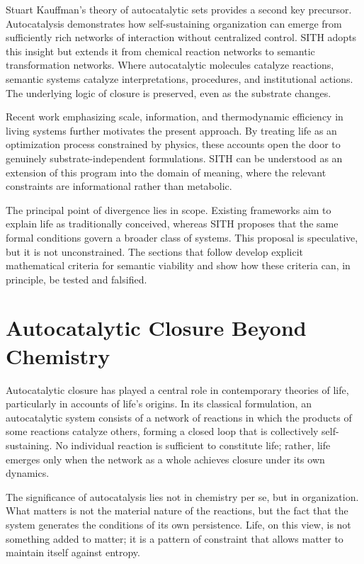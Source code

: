 \documentclass[11pt,oneside]{article}
\begin{document}
Stuart Kauffman’s theory of autocatalytic sets provides a second key precursor. Autocatalysis demonstrates how self-sustaining organization can emerge from sufficiently rich networks of interaction without centralized control. SITH adopts this insight but extends it from chemical reaction networks to semantic transformation networks. Where autocatalytic molecules catalyze reactions, semantic systems catalyze interpretations, procedures, and institutional actions. The underlying logic of closure is preserved, even as the substrate changes.

Recent work emphasizing scale, information, and thermodynamic efficiency in living systems further motivates the present approach. By treating life as an optimization process constrained by physics, these accounts open the door to genuinely substrate-independent formulations. SITH can be understood as an extension of this program into the domain of meaning, where the relevant constraints are informational rather than metabolic.

The principal point of divergence lies in scope. Existing frameworks aim to explain life as traditionally conceived, whereas SITH proposes that the same formal conditions govern a broader class of systems. This proposal is speculative, but it is not unconstrained. The sections that follow develop explicit mathematical criteria for semantic viability and show how these criteria can, in principle, be tested and falsified.


\section{Autocatalytic Closure Beyond Chemistry}

Autocatalytic closure has played a central role in contemporary theories of life, particularly in accounts of life’s origins. In its classical formulation, an autocatalytic system consists of a network of reactions in which the products of some reactions catalyze others, forming a closed loop that is collectively self-sustaining. No individual reaction is sufficient to constitute life; rather, life emerges only when the network as a whole achieves closure under its own dynamics.

The significance of autocatalysis lies not in chemistry per se, but in organization. What matters is not the material nature of the reactions, but the fact that the system generates the conditions of its own persistence. Life, on this view, is not something added to matter; it is a pattern of constraint that allows matter to maintain itself against entropy.
\end{document}
